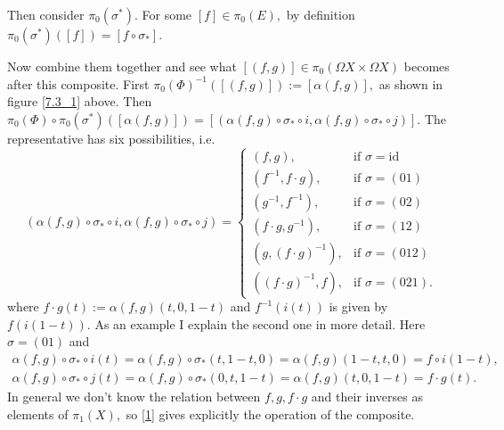 \documentclass{article}
\begin{document}
Then consider $\pi_0(\sigma^*).$ For some $[f]\in\pi_0(E),$ by definition $\pi_0(\sigma^*)([f])=[f\circ\sigma_*].$

Now combine them together and see what $[(f,g)]\in\pi_0(\Omega X\times\Omega X)$ becomes after this composite. First $\pi_0(\Phi)^{-1}([(f,g)]):=[\alpha(f,g)],$ as shown in figure \ref{7.3_1} above. Then $\pi_0(\Phi)\circ\pi_0(\sigma^*)([\alpha(f,g)])=[(\alpha(f,g)\circ\sigma_*\circ i,\alpha(f,g)\circ\sigma_*\circ j)].$ The representative has six possibilities, i.e.
\begin{equation}\label{1}
  (\alpha(f,g)\circ\sigma_*\circ i,\alpha(f,g)\circ\sigma_*\circ j)=
\begin{cases}
  (f,g), & \mbox{if } \sigma=\text{id} \\
  (f^{-1},f\cdot g), & \mbox{if } \sigma=(01) \\
  (g^{-1},f^{-1}), & \mbox{if } \sigma=(02) \\
  (f\cdot g,g^{-1}), & \mbox{if } \sigma=(12) \\
  (g,(f\cdot g)^{-1}), & \mbox{if } \sigma=(012) \\
  ((f\cdot g)^{-1},f), & \mbox{if } \sigma=(021).
\end{cases}
\end{equation}
where $f\cdot g(t):=\alpha(f,g)(t,0,1-t)$ and $f^{-1}(i(t))$ is given by $f(i(1-t)).$ As an example I explain the second one in more detail. Here $\sigma=(01)$ and
\begin{gather*}
  \alpha(f,g)\circ\sigma_*\circ i(t)=\alpha(f,g)\circ\sigma_*(t,1-t,0)=\alpha(f,g)(1-t,t,0)=f\circ i(1-t),\\
  \alpha(f,g)\circ\sigma_*\circ j(t)=\alpha(f,g)\circ\sigma_*(0,t,1-t)=\alpha(f,g)(t,0,1-t)=f\cdot g(t).
\end{gather*}
In general we don't know the relation between $f,g,f\cdot g$ and their inverses as elements of $\pi_1(X),$ so \eqref{1} gives explicitly the operation of the composite.
\end{document}
